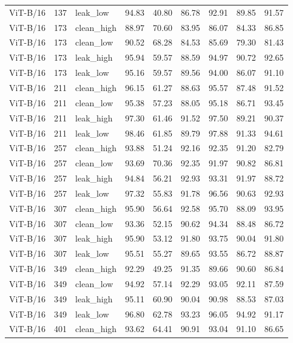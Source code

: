 {\begin{longtable}{lrlrrrrrr}
ViT-B/16 & 137 & leak\_low & 94.83 & 40.80 & 86.78 & 92.91 & 89.85 & 91.57 \\
ViT-B/16 & 173 & clean\_high & 88.97 & 70.60 & 83.95 & 86.07 & 84.33 & 86.85 \\
ViT-B/16 & 173 & clean\_low & 90.52 & 68.28 & 84.53 & 85.69 & 79.30 & 81.43 \\
ViT-B/16 & 173 & leak\_high & 95.94 & 59.57 & 88.59 & 94.97 & 90.72 & 92.65 \\
ViT-B/16 & 173 & leak\_low & 95.16 & 59.57 & 89.56 & 94.00 & 86.07 & 91.10 \\
ViT-B/16 & 211 & clean\_high & 96.15 & 61.27 & 88.63 & 95.57 & 87.48 & 91.52 \\
ViT-B/16 & 211 & clean\_low & 95.38 & 57.23 & 88.05 & 95.18 & 86.71 & 93.45 \\
ViT-B/16 & 211 & leak\_high & 97.30 & 61.46 & 91.52 & 97.50 & 89.21 & 90.37 \\
ViT-B/16 & 211 & leak\_low & 98.46 & 61.85 & 89.79 & 97.88 & 91.33 & 94.61 \\
ViT-B/16 & 257 & clean\_high & 93.88 & 51.24 & 92.16 & 92.35 & 91.20 & 82.79 \\
ViT-B/16 & 257 & clean\_low & 93.69 & 70.36 & 92.35 & 91.97 & 90.82 & 86.81 \\
ViT-B/16 & 257 & leak\_high & 94.84 & 56.21 & 92.93 & 93.31 & 91.97 & 88.72 \\
ViT-B/16 & 257 & leak\_low & 97.32 & 55.83 & 91.78 & 96.56 & 90.63 & 92.93 \\
ViT-B/16 & 307 & clean\_high & 95.90 & 56.64 & 92.58 & 95.70 & 88.09 & 93.95 \\
ViT-B/16 & 307 & clean\_low & 93.36 & 52.15 & 90.62 & 94.34 & 88.48 & 86.72 \\
ViT-B/16 & 307 & leak\_high & 95.90 & 53.12 & 91.80 & 93.75 & 90.04 & 91.80 \\
ViT-B/16 & 307 & leak\_low & 95.51 & 55.27 & 89.65 & 93.55 & 86.72 & 88.87 \\
ViT-B/16 & 349 & clean\_high & 92.29 & 49.25 & 91.35 & 89.66 & 90.60 & 86.84 \\
ViT-B/16 & 349 & clean\_low & 94.92 & 57.14 & 92.29 & 93.05 & 92.11 & 87.59 \\
ViT-B/16 & 349 & leak\_high & 95.11 & 60.90 & 90.04 & 90.98 & 88.53 & 87.03 \\
ViT-B/16 & 349 & leak\_low & 96.80 & 62.78 & 93.23 & 96.05 & 94.92 & 91.17 \\
ViT-B/16 & 401 & clean\_high & 93.62 & 64.41 & 90.91 & 93.04 & 91.10 & 86.65 \\

\end{longtable}}

